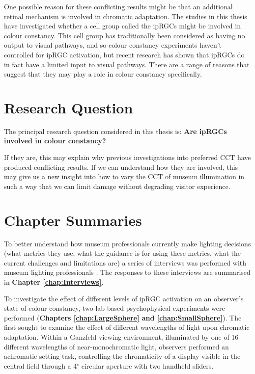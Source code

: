 One possible reason for these conflicting results might be that an additional retinal mechanism is involved in chromatic adaptation. The studies in this thesis have investigated whether a cell group called the \glspl{ipRGC} might be involved in colour constancy. This cell group has traditionally been considered as having no output to visual pathways, and so colour constancy experiments haven't controlled for \gls{ipRGC} activation, but recent research has shown that \glspl{ipRGC} do in fact have a limited input to visual pathways. There are a range of reasons that suggest that they may play a role in colour constancy specifically.

\section{Research Question}

The principal research question considered in this thesis is: \textbf{Are \glspl{ipRGC} involved in colour constancy?}

If they are, this may explain why previous investigations into preferred \gls{CCT} have produced conflicting results. If we can understand how they are involved, this may give us a new insight into how to vary the \gls{CCT} of museum illumination in such a way that we can limit damage without degrading visitor experience.

\section{Chapter Summaries}

To better understand how museum professionals currently make lighting decisions (what metrics they use, what the guidance is for using these metrics, what the current challenges and limitations are) a series of interviews was performed with museum lighting professionals \citep{garside_how_2017}. The responses to these interviews are summarised in \textbf{Chapter \ref{chap:Interviews}}.

To investigate the effect of different levels of \gls{ipRGC} activation on an observer's state of colour constancy, two lab-based psychophysical experiments were performed (\textbf{Chapters \ref{chap:LargeSphere} and \ref{chap:SmallSphere}}). The first sought to examine the effect of different wavelengths of light upon chromatic adaptation. Within a Ganzfeld viewing environment, illuminated by one of 16 different wavelengths of near-monochromatic light, observers performed an achromatic setting task, controlling the chromaticity of a display visible in the central field through a 4$^{\circ}$ circular aperture with two handheld sliders.

